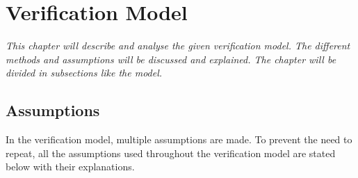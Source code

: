 \section{Verification Model}
\label{sec:verification_model}
\textit{This chapter will describe and analyse the given verification model. The different methods and assumptions will be discussed and explained. The chapter will be divided in subsections like the model.}

\subsection{Assumptions}
In the verification model, multiple assumptions are made. To prevent the need to repeat, all the assumptions used throughout the verification model are stated below with their explanations.\\
